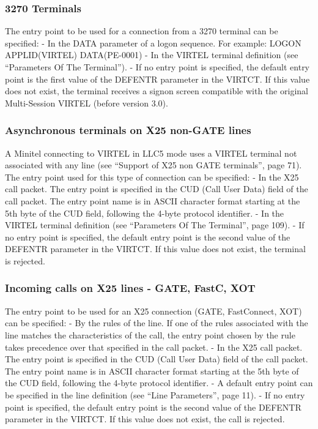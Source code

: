 \documentclass[letterpaper,10pt,english]{sphinxmanual}
\begin{document}
\subsubsection{3270 Terminals}
\label{\detokenize{connectivity_guide:id56}}
The entry point to be used for a connection from a 3270 terminal can be specified:
- In the DATA parameter of a logon sequence. For example: LOGON APPLID(VIRTEL) DATA(PE-0001)
- In the VIRTEL terminal definition (see “Parameters Of The Terminal”).
- If no entry point is specified, the default entry point is the first value of the DEFENTR parameter in the VIRTCT. If this value does not exist, the terminal receives a signon screen compatible with the original Multi-Session VIRTEL (before version 3.0).


\subsubsection{Asynchronous terminals on X25 non-GATE lines}
\label{\detokenize{connectivity_guide:asynchronous-terminals-on-x25-non-gate-lines}}
A Minitel connecting to VIRTEL in LLC5 mode uses a VIRTEL terminal not associated with any line (see “Support of X25 non GATE terminals”, page 71). The entry point used for this type of connection can be specified:
- In the X25 call packet. The entry point is specified in the CUD (Call User Data) field of the call packet. The entry point name is in ASCII character format starting at the 5th byte of the CUD field, following the 4-byte protocol identifier.
- In the VIRTEL terminal definition (see “Parameters Of The Terminal”, page 109).
- If no entry point is specified, the default entry point is the second value of the DEFENTR parameter in the VIRTCT. If this value does not exist, the terminal is rejected.


\subsubsection{Incoming calls on X25 lines - GATE, FastC, XOT}
\label{\detokenize{connectivity_guide:incoming-calls-on-x25-lines-gate-fastc-xot}}
The entry point to be used for an X25 connection (GATE, FastConnect, XOT) can be specified:
- By the rules of the line. If one of the rules associated with the line matches the characteristics of the call, the entry point chosen by the rule takes precedence over that specified in the call packet.
- In the X25 call packet. The entry point is specified in the CUD (Call User Data) field of the call packet. The entry point name is in ASCII character format starting at the 5th byte of the CUD field, following the 4-byte protocol identifier.
- A default entry point can be specified in the line definition (see “Line Parameters”, page 11).
- If no entry point is specified, the default entry point is the second value of the DEFENTR parameter in the VIRTCT. If this value does not exist, the call is rejected.
\end{document}
